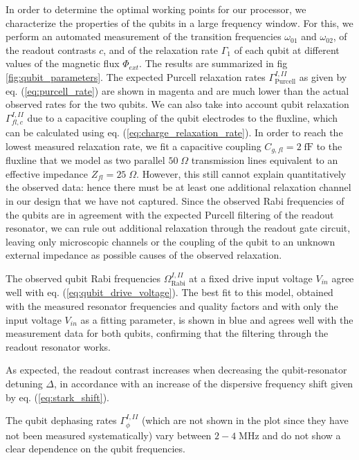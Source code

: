 In order to determine the optimal working points for our processor, we characterize the properties of the qubits in a large frequency window. For this, we perform an automated measurement of the transition frequencies $\omega_{01}$ and $\omega_{02}$, of the readout contrasts $c$,  and of the relaxation rate $\Gamma_1$ of each qubit at different values of the magnetic flux $\Phi_{ext}$. The results are summarized in fig \ref{fig:qubit_parameters}. The expected Purcell relaxation rates $\Gamma_\mathrm{Purcell}^{I,II}$ as given by eq. (\ref{eq:purcell_rate}) are shown in magenta and are much lower than the actual observed rates for the two qubits. We can also take into account qubit relaxation $\Gamma_{fl,c}^{I,II}$ due to a capacitive coupling of the qubit electrodes to the fluxline, which can be calculated using eq. (\ref{eq:charge_relaxation_rate}). In order to reach the lowest measured relaxation rate, we fit a capacitive coupling $C_{g,fl} = 2\;\mathrm{fF}$ to the fluxline that we model as two parallel $50\;\Omega$ transmission lines equivalent to an effective impedance $Z_{fl} = 25\;\Omega$. However, this still cannot explain quantitatively the observed data: hence there must be at least one additional relaxation channel in our design that we have not captured. Since the observed Rabi frequencies of the qubits are in agreement with the expected Purcell filtering of the readout resonator, we can rule out additional relaxation through the readout gate circuit, leaving only microscopic channels or the coupling of the qubit to an unknown external impedance as possible causes of the observed relaxation.

\smallskip

The observed qubit Rabi frequencies $\Omega_\mathrm{Rabi}^{I,II}$ at a fixed drive input voltage $V_{in}$ agree well with eq. (\ref{eq:qubit_drive_voltage}). The best fit to this model, obtained with the measured resonator frequencies and quality factors and with only the input voltage $V_{in}$ as a fitting parameter, is shown in blue and agrees well with the measurement data for both qubits, confirming that the filtering through the readout resonator works.

\smallskip

As expected, the readout contrast increases when decreasing the qubit-resonator detuning $\Delta$, in accordance with an increase of the dispersive frequency shift given by eq. (\ref{eq:stark_shift}).

\smallskip

The qubit dephasing rates $\Gamma_\phi^{I,II}$ (which are not shown in the plot since they have not been measured systematically) vary between $2-4\;\mathrm{MHz}$ and do not show a clear dependence on the qubit frequencies.

